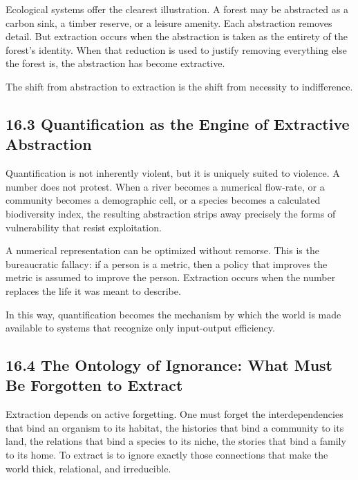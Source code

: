 \documentclass[12pt,letterpaper]{article}
\theoremstyle{remark}
\begin{document}
Ecological systems offer the clearest illustration. A forest may be abstracted as a carbon sink, a timber reserve, or a leisure amenity. Each abstraction removes detail. But extraction occurs when the abstraction is taken as the entirety of the forest’s identity. When that reduction is used to justify removing everything else the forest is, the abstraction has become extractive.

The shift from abstraction to extraction is the shift from necessity to indifference.

\subsection{16.3 Quantification as the Engine of Extractive Abstraction}

Quantification is not inherently violent, but it is uniquely suited to violence. A number does not protest. When a river becomes a numerical flow-rate, or a community becomes a demographic cell, or a species becomes a calculated biodiversity index, the resulting abstraction strips away precisely the forms of vulnerability that resist exploitation.

A numerical representation can be optimized without remorse. This is the bureaucratic fallacy: if a person is a metric, then a policy that improves the metric is assumed to improve the person. Extraction occurs when the number replaces the life it was meant to describe.

In this way, quantification becomes the mechanism by which the world is made available to systems that recognize only input-output efficiency.

\subsection{16.4 The Ontology of Ignorance: What Must Be Forgotten to Extract}

Extraction depends on active forgetting. One must forget the interdependencies that bind an organism to its habitat, the histories that bind a community to its land, the relations that bind a species to its niche, the stories that bind a family to its home. To extract is to ignore exactly those connections that make the world thick, relational, and irreducible.
\end{document}
